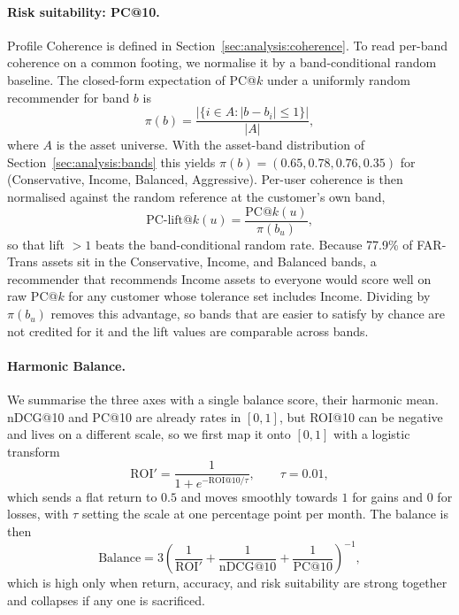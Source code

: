 \paragraph{Risk suitability: PC@10.} Profile Coherence is defined in Section~\ref{sec:analysis:coherence}. To read per-band coherence on a common footing, we normalise it by a band-conditional random baseline. The closed-form expectation of PC@$k$ under a uniformly random recommender for band $b$ is
\begin{equation}
\pi(b) = \frac{|\{ i \in A : |b - b_i| \leq 1 \}|}{|A|},
\end{equation}
where $A$ is the asset universe. With the asset-band distribution of Section~\ref{sec:analysis:bands} this yields $\pi(b) = (0.65, 0.78, 0.76, 0.35)$ for (Conservative, Income, Balanced, Aggressive). Per-user coherence is then normalised against the random reference at the customer's own band,
\begin{equation}
\text{PC-lift@}k(u) = \frac{\text{PC@}k(u)}{\pi(b_u)},
\end{equation}
so that lift $> 1$ beats the band-conditional random rate. Because 77.9\% of FAR-Trans assets sit in the Conservative, Income, and Balanced bands, a recommender that recommends Income assets to everyone would score well on raw PC@$k$ for any customer whose tolerance set includes Income. Dividing by $\pi(b_u)$ removes this advantage, so bands that are easier to satisfy by chance are not credited for it and the lift values are comparable across bands.

\paragraph{Harmonic Balance.} We summarise the three axes with a single balance score, their harmonic mean. nDCG@10 and PC@10 are already rates in $[0, 1]$, but ROI@10 can be negative and lives on a different scale, so we first map it onto $[0, 1]$ with a logistic transform
\begin{equation}
\text{ROI}' = \frac{1}{1 + e^{-\text{ROI@10} / \tau}}, \qquad \tau = 0.01,
\end{equation}
which sends a flat return to $0.5$ and moves smoothly towards $1$ for gains and $0$ for losses, with $\tau$ setting the scale at one percentage point per month. The balance is then
\begin{equation}
\text{Balance} = 3 \left( \frac{1}{\text{ROI}'} + \frac{1}{\text{nDCG@10}} + \frac{1}{\text{PC@10}} \right)^{-1},
\end{equation}
which is high only when return, accuracy, and risk suitability are strong together and collapses if any one is sacrificed.

